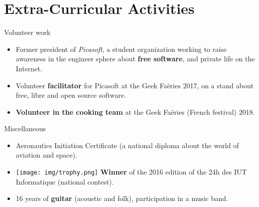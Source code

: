 \documentclass[a4paper]{twentysecondcv} %
\begin{document}
\section{Extra-Curricular Activities}
\begin{twenty}
    \twentyitem
    	{}
		{}
        {Volunteer work}
        {}
        {}
        {\begin{itemize}
        \item Former president of \textit{Picasoft}, a student organization working to raise awareness in the engineer sphere about \textbf{free software}, and private life on the Internet.
        \item Volunteer \textbf{facilitator} for Picasoft at the Geek Faëries 2017, on a stand about free, libre and open source software.
        \item \textbf{Volunteer in the cooking team} at the Geek Faëries (French festival) 2018.
        \end{itemize}}
    \twentyitem
        {}
                {}
        {Miscellaneous}
        {}
        {}
        {\begin{itemize}
        \item Aeronautics Initiation Certificate (a national diploma about the world of aviation and space).
        \item \texttt{[image: img/trophy.png]} \textbf{Winner} of the 2016 edition of the 24h des IUT Informatique (national contest).
        \item 16 years of \textbf{guitar} (acoustic and folk), participation in a music band.
        \end{itemize}}
\end{twenty}
\end{document}
